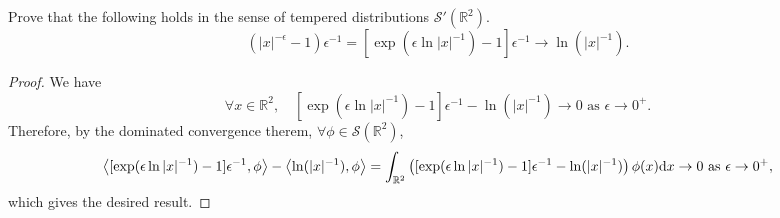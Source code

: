 \begin{pro}
  Prove that the following holds in the sense of tempered distributions $\mathcal{S}'(\mathbb{R}^2)$.
  \begin{displaymath}
    (|x|^{-\epsilon}-1)\epsilon^{-1} = [\exp(\epsilon\ln|x|^{-1})-1]
    \epsilon^{-1} \to \ln(|x|^{-1}).
  \end{displaymath}
\end{pro}

\begin{proof}
  We have
  \begin{displaymath}
    \forall x\in\mathbb{R}^2, \quad
    [\exp(\epsilon\ln|x|^{-1})-1]\epsilon^{-1} - \ln(|x|^{-1}) \to 0
    \text{ as } \epsilon\to 0^+.
  \end{displaymath}
  Therefore, by the dominated convergence therem,
  $\forall \phi\in\mathcal{S}(\mathbb{R}^2)$,
  \begin{align*}
    \left\langle [\exp(\epsilon\ln|x|^{-1})-1]\epsilon^{-1}, \phi\right\rangle -
    \left\langle \ln(|x|^{-1}), \phi\right\rangle =
    \int_{\mathbb{R}^2}\left([\exp(\epsilon\ln|x|^{-1})-1]\epsilon^{-1}-
    \ln(|x|^{-1})\right)\phi(x)\mathrm{d} x \to 0 \text{ as } \epsilon\to 0^+,
  \end{align*}
  which gives the desired result.
\end{proof}

